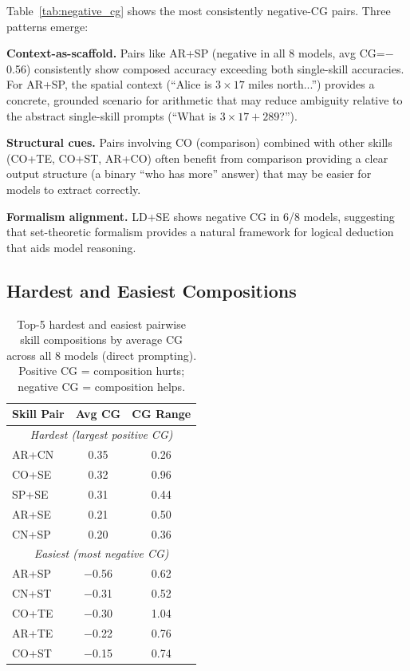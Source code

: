\documentclass{article}
\begin{document}
Table~\ref{tab:negative_cg} shows the most consistently negative-CG pairs. Three patterns emerge:

\textbf{Context-as-scaffold.} Pairs like AR+SP (negative in all 8 models, avg CG=$-$0.56) consistently show composed accuracy exceeding both single-skill accuracies. For AR+SP, the spatial context (``Alice is $3\times17$ miles north...'') provides a concrete, grounded scenario for arithmetic that may reduce ambiguity relative to the abstract single-skill prompts (``What is $3 \times 17 + 289$?'').

\textbf{Structural cues.} Pairs involving CO (comparison) combined with other skills (CO+TE, CO+ST, AR+CO) often benefit from comparison providing a clear output structure (a binary ``who has more'' answer) that may be easier for models to extract correctly.

\textbf{Formalism alignment.} LD+SE shows negative CG in 6/8 models, suggesting that set-theoretic formalism provides a natural framework for logical deduction that aids model reasoning.

\subsection{Hardest and Easiest Compositions}

\begin{table}[t]
\centering
\caption{Top-5 hardest and easiest pairwise skill compositions by average CG across all 8 models (direct prompting). Positive CG = composition hurts; negative CG = composition helps.}
\label{tab:hard_easy}
\begin{tabular}{lcc}
\toprule
Skill Pair & Avg CG & CG Range \\
\midrule
\multicolumn{3}{c}{\textit{Hardest (largest positive CG)}} \\
\midrule
AR+CN & 0.35 & 0.26 \\
CO+SE & 0.32 & 0.96 \\
SP+SE & 0.31 & 0.44 \\
AR+SE & 0.21 & 0.50 \\
CN+SP & 0.20 & 0.36 \\
\midrule
\multicolumn{3}{c}{\textit{Easiest (most negative CG)}} \\
\midrule
AR+SP & $-$0.56 & 0.62 \\
CN+ST & $-$0.31 & 0.52 \\
CO+TE & $-$0.30 & 1.04 \\
AR+TE & $-$0.22 & 0.76 \\
CO+ST & $-$0.15 & 0.74 \\
\bottomrule
\end{tabular}
\end{table}
\end{document}
